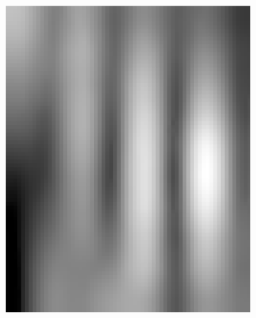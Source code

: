 \begin{figure}[h!]
\begin{subfigure}{0.22\textwidth}
		\includegraphics[width=\linewidth]{Images/KDDProcess/thirdFilter}
		\caption{}    %
		\label{subfig:thirdFilter}
	\end{subfigure}
	\hfill
	\begin{subfigure}{0.22\textwidth}

\end{subfigure}
\end{figure}
